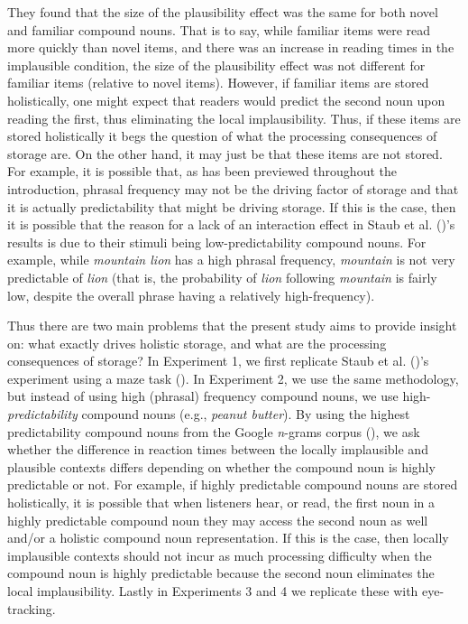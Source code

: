 \documentclass[
  12pt,
  letterpaper,
]{scrreport}
\begin{document}
\noindent They found that the size of the plausibility effect was the
same for both novel and familiar compound nouns. That is to say, while
familiar items were read more quickly than novel items, and there was an
increase in reading times in the implausible condition, the size of the
plausibility effect was not different for familiar items (relative to
novel items). However, if familiar items are stored holistically, one
might expect that readers would predict the second noun upon reading the
first, thus eliminating the local implausibility. Thus, if these items
are stored holistically it begs the question of what the processing
consequences of storage are. On the other hand, it may just be that
these items are not stored. For example, it is possible that, as has
been previewed throughout the introduction, phrasal frequency may not be
the driving factor of storage and that it is actually predictability
that might be driving storage. If this is the case, then it is possible
that the reason for a lack of an interaction effect in Staub et al.
()'s results is due
to their stimuli being low-predictability compound nouns. For example,
while \emph{mountain lion} has a high phrasal frequency, \emph{mountain}
is not very predictable of \emph{lion} (that is, the probability of
\emph{lion} following \emph{mountain} is fairly low, despite the overall
phrase having a relatively high-frequency).

Thus there are two main problems that the present study aims to provide
insight on: what exactly drives holistic storage, and what are the
processing consequences of storage? In Experiment 1, we first replicate
Staub et al. ()'s
experiment using a maze task (). In Experiment 2, we use the same methodology, but
instead of using high (phrasal) frequency compound nouns, we use
high-\emph{predictability} compound nouns (e.g., \emph{peanut butter}).
By using the highest predictability compound nouns from the Google
\emph{n}-grams corpus
(), we ask whether the difference in reaction times between the
locally implausible and plausible contexts differs depending on whether
the compound noun is highly predictable or not. For example, if highly
predictable compound nouns are stored holistically, it is possible that
when listeners hear, or read, the first noun in a highly predictable
compound noun they may access the second noun as well and/or a holistic
compound noun representation. If this is the case, then locally
implausible contexts should not incur as much processing difficulty when
the compound noun is highly predictable because the second noun
eliminates the local implausibility. Lastly in Experiments 3 and 4 we
replicate these with eye-tracking.
\end{document}
